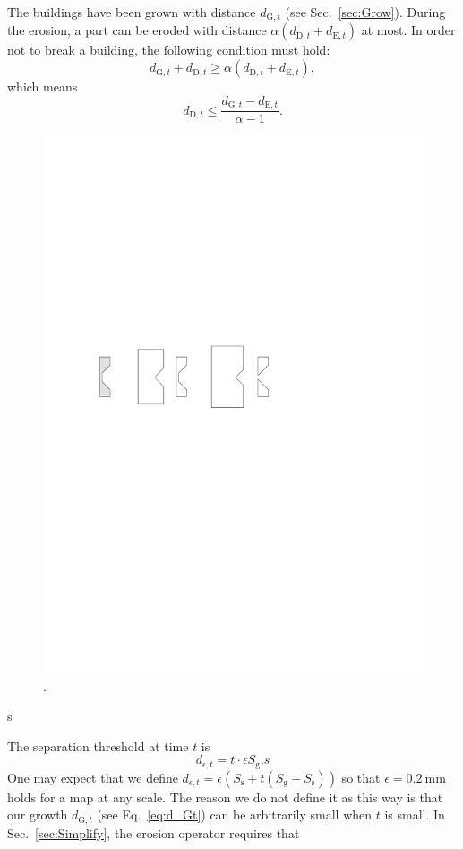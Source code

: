 \documentclass[graybox]{svmult}
\newcommand{\eq}{Eq.~}
\newcommand{\sect}{Sec.~}
\newcommand{\dtrm}[1]{d_{\mathrm{#1},t}}
\begin{document}
The buildings have been grown with distance $\dtrm{G}$ 
(see \sect\ref{sec:Grow}).
During the erosion, a part can be eroded with distance 
$\alpha (\dtrm{D}+\dtrm{E})$ at most.
In order not to break a building, the following condition must hold:
\[
\dtrm{G} + \dtrm{D} \ge \alpha (\dtrm{D}+\dtrm{E}),
\]
which means
\[
\dtrm{D} \le \frac{\dtrm{G}-\dtrm{E}}{\alpha - 1}.
\]

\begin{figure}[tb]
	\centering
	\includegraphics[draft=false]{ErosionBreak}
	\caption{.}
	\label{fig:ErosionBreak}
\end{figure}
s


The separation threshold at time $t$ is
\[
d_{\epsilon, t} =t \cdot \epsilon S_\mathrm{g}.s
\]
One may expect that we define 
$d_{\epsilon, t} = \epsilon (S_\mathrm{s}+t(S_\mathrm{g}-S_\mathrm{s}))$
so that $\epsilon= 0.2~\text{mm}$ holds for a map at any scale.
The reason we do not define it as this way is that 
our growth $\dtrm{G}$ (see \eq\ref{eq:d_Gt}) can be arbitrarily small when $t$ 
is small.
In \sect\ref{sec:Simplify}, the erosion operator requires that 
\end{document}
